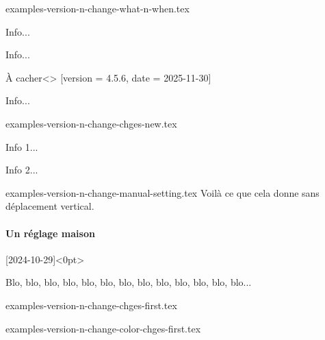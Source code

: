 \begin{filecontents*}[overwrite]{examples-version-n-change-what-n-when.tex}
\begin{tdoctech}[date      = 2024-10-29,
                 col-chges = red]
    \item Info...
\end{tdoctech}

\begin{tdocupdate}[version   = 1.2.3,
                   col-chges = ForestGreen,
                   col       = ForestGreen]
    \item Info...
\end{tdocupdate}

\begin{tdoctopic}{À cacher}<\faEyeSlash>%
                 [version = 4.5.6,
                  date    = 2025-11-30]
    \item Info...
\end{tdoctopic}
\end{filecontents*}


\begin{filecontents*}[overwrite]{examples-version-n-change-chges-new.tex}
\begin{tdocnew}
    \item Info 1...
    \item Info 2...
\end{tdocnew}
\end{filecontents*}


\begin{filecontents*}[overwrite]{examples-version-n-change-manual-setting.tex}
Voilà ce que cela donne sans déplacement vertical.

\paragraph{Un réglage maison}%
[2024-10-29]<0pt>

Blo, blo, blo, blo, blo, blo, blo, blo, blo, blo, blo, blo, blo...
\end{filecontents*}


\begin{filecontents*}[overwrite]{examples-version-n-change-chges-first.tex}
\end{filecontents*}


\begin{filecontents*}[overwrite]{examples-version-n-change-color-chges-first.tex}
\end{filecontents*}



